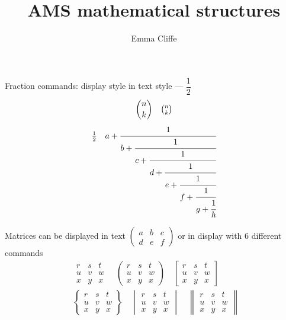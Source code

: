 \documentclass[12pt,a4paper,onecolumn]{article}
\title{AMS mathematical structures}
\author{Emma Cliffe}
\date{}
\begin{document}
\maketitle

\noindent
Fraction commands: display style in text style --- $\dfrac{1}{2}$
\begin{equation}
\binom{n}{k} \quad \tbinom{n}{k} 
\end{equation}
\begin{equation}
\tfrac{1}{2} \quad %
a + \cfrac{1}{b + \cfrac{1}{c + \cfrac{1}{d + \cfrac{1}{e + \cfrac{1}{f + \cfrac{1}{g + \cfrac{1}{h}}}}}}}
\end{equation}

\noindent
Matrices can be displayed in text $\left(\begin{smallmatrix} a & b & c \\ d & e & f\end{smallmatrix}\right)$ or in display with 6 different commands
\begin{eqnarray*}
&&\begin{matrix} r & s & t \\ u & v & w \\ x & y & x\end{matrix}\quad
\begin{pmatrix} r & s & t \\ u & v & w \\ x & y & x\end{pmatrix}\quad
\begin{bmatrix} r & s & t \\ u & v & w \\ x & y & x\end{bmatrix}\\
&&\begin{Bmatrix} r & s & t \\ u & v & w \\ x & y & x\end{Bmatrix}\quad
\begin{vmatrix} r & s & t \\ u & v & w \\ x & y & x\end{vmatrix}\quad
\begin{Vmatrix} r & s & t \\ u & v & w \\ x & y & x\end{Vmatrix}\quad
\end{eqnarray*}
\end{document}

